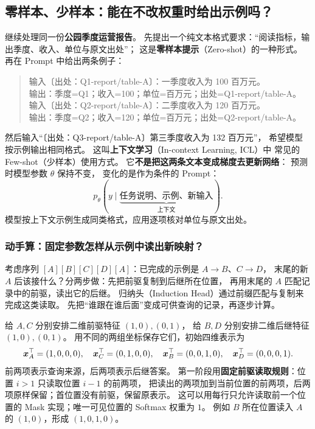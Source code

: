 \subsection{零样本、少样本：能在不改权重时给出示例吗？}
\label{concept:few-shot}

继续处理同一份\textbf{公园季度运营报告}。
先提出一个纯文本格式要求：“阅读指标，输出季度、收入、单位与原文出处”；
这是\textbf{零样本提示}（Zero-shot）的一种形式。
再在 Prompt 中给出两条例子：

\begin{quote}
输入〔出处：Q1-report/table-A〕：一季度收入为 100 百万元。\\
输出：季度=Q1；收入=100；单位=百万元；出处=Q1-report/table-A。\\
输入〔出处：Q2-report/table-A〕：二季度收入为 120 百万元。\\
输出：季度=Q2；收入=120；单位=百万元；出处=Q2-report/table-A。
\end{quote}

然后输入“〔出处：Q3-report/table-A〕第三季度收入为 132 百万元”，
希望模型按示例输出相同格式。
这叫\textbf{上下文学习}（In-context Learning, ICL）中
常见的 Few-shot（少样本）使用方式。
它\textbf{不是把这两条文本变成梯度去更新网络}：
预测时模型参数 $\theta$ 保持不变，
变化的是作为条件的 Prompt：
\[
p_\theta(y\mid\underbrace{\text{任务说明、示例、新输入}}_{\text{上下文}}).
\]
模型按上下文示例生成同类格式，应用逐项核对单位与原文出处。

\subsubsection{动手算：固定参数怎样从示例中读出新映射？}
\label{sec:icl-induction}
考虑序列 $[A][B][C][D][A]$：已完成的示例是 $A\to B$、$C\to D$，
末尾的新 $A$ 后该接什么？分两步做：先把前驱复制到后继所在位置，
再用末尾的 $A$ 匹配记录中的前驱，读出它的后继。
归纳头（Induction Head）通过前缀匹配与复制来完成这类读取。
先把“谁跟在谁后面”变成可供查询的记录，再逐步计算。

给 $A,C$ 分别安排二维前驱特征 $(1,0),(0,1)$，
给 $B,D$ 分别安排二维后继特征 $(1,0),(0,1)$。
用不同的两组坐标保存它们，初始四维表示为
\[
\boldsymbol{x}_A^\top=(1,0,0,0),\quad \boldsymbol{x}_C^\top=(0,1,0,0),\quad
\boldsymbol{x}_B^\top=(0,0,1,0),\quad \boldsymbol{x}_D^\top=(0,0,0,1).
\]
前两项表示查询来源，后两项表示后继答案。
第一阶段用\textbf{固定前驱读取规则}：位置 $i>1$ 只读取位置 $i-1$ 的前两项，
把读出的两项加到当前位置的前两项，后两项原样保留；首位置没有前驱，保留原表示。
这可以用每行只允许读取前一个位置的 Mask 实现；唯一可见位置的 Softmax 权重为 $1$。
例如 $B$ 所在位置读入 $A$ 的 $(1,0)$，形成 $(1,0,1,0)$。

